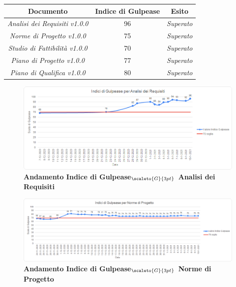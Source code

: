 \quad
\def\tabularxcolumn#1{m{#1}}
{
	\begin{center}
		\renewcommand{\arraystretch}{1.4}
		\begin{tabularx}{11.65cm}{|c|c|c|}
			\hline
			\rowcolor{airforceblue}
			\textbf{Documento} & \textbf{Indice di Gulpease} & \textbf{Esito}\\
			\hline
			\textit{Analisi dei Requisiti v1.0.0} & 96  & \textit{Superato}\\
			\hline
			\textit{Norme di Progetto v1.0.0} & 75 & \textit{Superato}\\
			\hline
			\textit{Studio di Fattibilità v1.0.0} & 70 & \textit{Superato}\\
			\hline
			\textit{Piano di Progetto v1.0.0} & 77 & \textit{Superato}\\
			\hline
			\textit{Piano di Qualifica v1.0.0} & 80 & \textit{Superato}\\
			\hline
		\end{tabularx}
	\end{center}


\begin{figure}[!h]
	\begin{center}
		\includegraphics[width=1\linewidth]{../immagini/IndexGulpeaseAdR.png}
		\caption{\textbf{Andamento Indice di Gulpease$_{\scaleto{G}{3pt}}$ Analisi dei Requisiti}}
	\end{center}
\end{figure}

\begin{figure}[!h]
	\begin{center}
		\includegraphics[width=1\linewidth]{../immagini/IndexGulpeaseNdP.png}
		\caption{\textbf{Andamento Indice di Gulpease$_{\scaleto{G}{3pt}}$ Norme di Progetto}}
	\end{center}
\end{figure}

}
